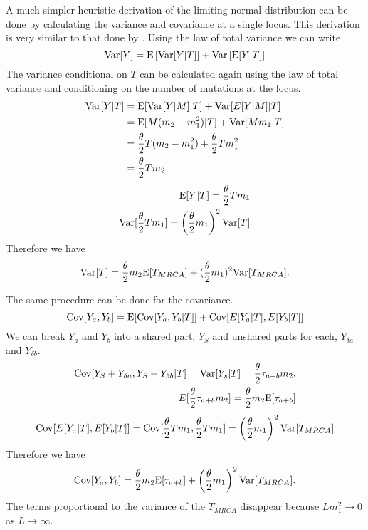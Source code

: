 A much simpler heuristic derivation of the limiting normal distribution can be
done by calculating the variance and covariance at a single locus. This
derivation is very similar to that done by \citet{Schraiber2015}. Using the law
of total variance we can write
\begin{equation*}
  \mathrm{Var}[Y] = \mathrm{E}\left[\mathrm{Var}[Y|T]\right] +
  \mathrm{Var}\left[\mathrm{E}[Y|T]\right]
\end{equation*}
The variance conditional on $T$ can be calculated again using the law of total
variance and conditioning on the number of mutations at the locus. 
\begin{align*}
  \mathrm{Var}[Y|T] &= \mathrm{E}[\mathrm{Var}[Y|M]|T] + \mathrm{Var}[E[Y|M]|T]\\
            &= \mathrm{E}[M(m_2-m_1^2)|T] + \mathrm{Var}[Mm_1|T]\\
            &= \frac{\theta}{2} T (m_2-m_1^2) + \frac{\theta}{2} T m_1^2\\
            &= \frac{\theta}{2} T m_2
\end{align*}
\begin{align*}
  \mathrm{E}[Y|T] = \frac{\theta}{2} T m_1\\
  \mathrm{Var}[\frac{\theta}{2} T m_1] = \left( \frac{\theta}{2} m_1\right)^2\mathrm{Var}[T]
\end{align*}
Therefore we have
\begin{equation}
  \mathrm{Var}[T] = \frac{\theta}{2} m_2 \mathrm{E}[T_{MRCA}] + (\frac{\theta}{2} m_1)^2 \mathrm{Var}[T_{MRCA}].
\end{equation}

The same procedure can be done for the covariance.
\begin{equation*}
  \mathrm{Cov}[Y_a,Y_b] = \mathrm{E}[\mathrm{Cov}[Y_a,Y_b|T]] + \mathrm{Cov}[E[Y_a|T],E[Y_b|T]]
\end{equation*}
We can break $Y_a$ and $Y_b$ into a shared part, $Y_S$ and unshared parts for
each, $Y_{\delta a}$ and $Y_{\delta b}$.
\begin{align*}
  \mathrm{Cov}[Y_S + Y_{\delta a}, Y_S + Y_{\delta b}|T] = \mathrm{Var}[Y_s|T] = \frac{\theta}{2} \tau_{a+b} m_2.\\
  E[\frac{\theta}{2} \tau_{a+b} m_2] = \frac{\theta}{2} m_2\mathrm{E}[\tau_{a+b}]
\end{align*}
\begin{align*}
  \mathrm{Cov}[E[Y_a|T],E[Y_b|T]] = \mathrm{Cov}[\frac{\theta}{2} T m_1, \frac{\theta}{2} T m_1] = \left( \frac{\theta}{2} m_1 \right)^2\mathrm{Var}[T_{MRCA}]
\end{align*}
Therefore we have
\begin{equation}
  \mathrm{Cov}[Y_a,Y_b] = \frac{\theta}{2} m_2 \mathrm{E}[\tau_{a+b}] + \left( \frac{\theta}{2} m_1 \right)^2 \mathrm{Var}[T_{MRCA}].
\end{equation}
The terms proportional to the variance of the $T_{MRCA}$ disappear because
$Lm_1^2 \to 0$ as $L \to \infty$.


